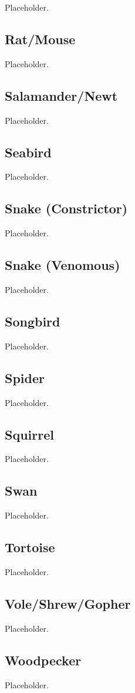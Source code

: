 Placeholder.

\subsection{Rat/Mouse}

Placeholder.

\subsection{Salamander/Newt}

Placeholder.

\subsection{Seabird}

Placeholder.

\subsection{Snake (Constrictor)}

Placeholder.

\subsection{Snake (Venomous)}

Placeholder.

\subsection{Songbird}

Placeholder.

\subsection{Spider}

Placeholder.

\subsection{Squirrel}

Placeholder.

\subsection{Swan}

Placeholder.

\subsection{Tortoise}

Placeholder.

\subsection{Vole/Shrew/Gopher}

Placeholder.

\subsection{Woodpecker}

Placeholder.
